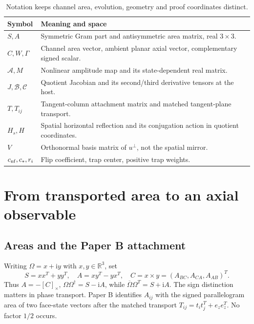 \documentclass[11pt,a4paper]{article}
\newcommand{\R}{\mathbb R}\newcommand{\C}{\mathbb C}\newcommand{\Om}{\Omega}\newcommand{\Fh}{\widehat F}\newcommand{\cof}{\operatorname{cof}}\newcommand{\diag}{\operatorname{diag}}\newcommand{\Argz}{\operatorname{Arg}_0}\newcommand{\iu}{\mathrm i}\newcommand{\dd}{\mathrm d}
\begin{document}
\begin{table}[ht]
\centering\small
\begin{tabular}{p{.19\linewidth}p{.74\linewidth}}\toprule
Symbol & Meaning and space\\\midrule
$S,A$ & Symmetric Gram part and antisymmetric area matrix, real $3\times3$.\\
$C,W,\Gamma$ & Channel area vector, ambient planar axial vector, complementary signed scalar.\\
$\mathcal A,M$ & Nonlinear amplitude map and its state-dependent real matrix.\\
$J,\mathcal B,\mathcal C$ & Quotient Jacobian and its second/third derivative tensors at the host.\\
$T,T_{ij}$ & Tangent-column attachment matrix and matched tangent-plane transport.\\
$H_s,H$ & Spatial horizontal reflection and its conjugation action in quotient coordinates.\\
$V$ & Orthonormal basis matrix of $u^\perp$, not the spatial mirror.\\
$c_{\rm nf},c_*,r_i$ & Flip coefficient, trap center, positive trap weights.\\\bottomrule
\end{tabular}
\caption{Notation keeps channel area, evolution, geometry and proof coordinates distinct.}
\end{table}

\section{From transported area to an axial observable}
\subsection{Areas and the Paper B attachment}
Writing $\Om=x+\iu y$ with $x,y\in\R^3$, set
\begin{equation}
 S=xx^T+yy^T,\quad A=xy^T-yx^T,\quad
 C=x\times y=(A_{BC},A_{CA},A_{AB})^T.\label{eq:SA}
\end{equation}
Thus $A=-[C]_\times$, $\Om\Om^\dagger=S-\iu A$, while $\overline\Om\Om^T=S+\iu A$. The sign distinction matters in phase transport. Paper B identifies $A_{ij}$ with the signed parallelogram area of two face-state vectors after the matched transport $T_{ij}=t_it_j^T+e_ze_z^T$. No factor $1/2$ occurs.
\end{document}
